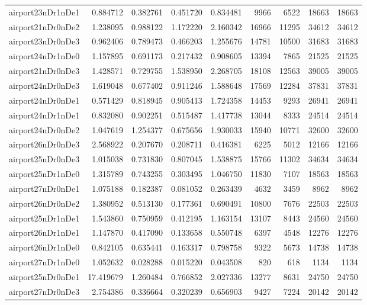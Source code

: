 \begin{longtable}{|l|r|r|r|r|r|r|r|r|}
airport23nDr1nDe1 & 0.884712 & 0.382761 & 0.451720 & 0.834481 & 9966 & 6522 & 18663 & 18663 \\
airport21nDr0nDe2 & 1.238095 & 0.988122 & 1.172220 & 2.160342 & 16966 & 11295 & 34612 & 34612 \\
airport23nDr0nDe3 & 0.962406 & 0.789473 & 0.466203 & 1.255676 & 14781 & 10500 & 31683 & 31683 \\
airport24nDr1nDe0 & 1.157895 & 0.691173 & 0.217432 & 0.908605 & 13394 & 7865 & 21525 & 21525 \\
airport21nDr0nDe3 & 1.428571 & 0.729755 & 1.538950 & 2.268705 & 18108 & 12563 & 39005 & 39005 \\
airport24nDr0nDe3 & 1.619048 & 0.677402 & 0.911246 & 1.588648 & 17569 & 12284 & 37831 & 37831 \\
airport24nDr0nDe1 & 0.571429 & 0.818945 & 0.905413 & 1.724358 & 14453 & 9293 & 26941 & 26941 \\
airport24nDr1nDe1 & 0.832080 & 0.902251 & 0.515487 & 1.417738 & 13044 & 8333 & 24514 & 24514 \\
airport24nDr0nDe2 & 1.047619 & 1.254377 & 0.675656 & 1.930033 & 15940 & 10771 & 32600 & 32600 \\
airport26nDr0nDe3 & 2.568922 & 0.207670 & 0.208711 & 0.416381 & 6225 & 5012 & 12166 & 12166 \\
airport25nDr0nDe3 & 1.015038 & 0.731830 & 0.807045 & 1.538875 & 15766 & 11302 & 34634 & 34634 \\
airport25nDr1nDe0 & 1.315789 & 0.743255 & 0.303495 & 1.046750 & 11830 & 7107 & 18563 & 18563 \\
airport27nDr0nDe1 & 1.075188 & 0.182387 & 0.081052 & 0.263439 & 4632 & 3459 & 8962 & 8962 \\
airport26nDr0nDe2 & 1.380952 & 0.513130 & 0.177361 & 0.690491 & 10800 & 7676 & 22503 & 22503 \\
airport25nDr1nDe1 & 1.543860 & 0.750959 & 0.412195 & 1.163154 & 13107 & 8443 & 24560 & 24560 \\
airport26nDr1nDe1 & 1.147870 & 0.417090 & 0.133658 & 0.550748 & 6397 & 4548 & 12276 & 12276 \\
airport26nDr1nDe0 & 0.842105 & 0.635441 & 0.163317 & 0.798758 & 9322 & 5673 & 14738 & 14738 \\
airport27nDr1nDe0 & 1.052632 & 0.028288 & 0.015220 & 0.043508 & 820 & 618 & 1134 & 1134 \\
airport25nDr0nDe1 & 17.419679 & 1.260484 & 0.766852 & 2.027336 & 13277 & 8631 & 24750 & 24750 \\
airport27nDr0nDe3 & 2.754386 & 0.336664 & 0.320239 & 0.656903 & 9427 & 7224 & 20142 & 20142 \\

\end{longtable}
